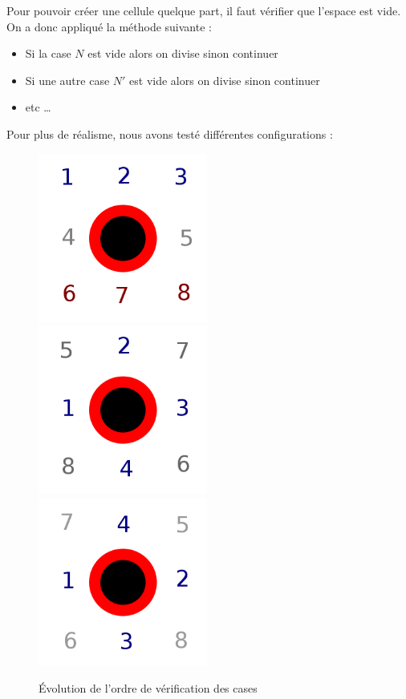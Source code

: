   Pour pouvoir créer une cellule quelque part, il faut vérifier que l'espace est vide. On a donc appliqué la méthode suivante : 
        \begin{itemize} \item Si la case $N$ est vide alors on divise sinon continuer 
            \item Si une autre case $N'$ est vide alors on divise sinon continuer
            \item etc … 
            \end{itemize}
  Pour plus de réalisme, nous avons testé différentes configurations : 
    \begin{figure}[H]
      \centering
      \includegraphics[width=15em]{Images/div_1.png}
      \includegraphics[width=15em]{Images/div_2.png}
      \includegraphics[width=15em]{Images/div_3.png}
      \caption{Évolution de l'ordre de vérification des cases}
    \end{figure}
  
